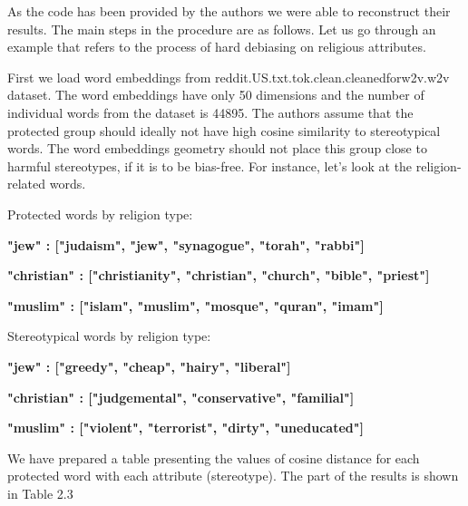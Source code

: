 \documentclass[12pt,]{book}
\begin{document}
As the code has been provided by the authors we were able to reconstruct
their results. The main steps in the procedure are as follows. Let us go
through an example that refers to the process of hard debiasing on
religious attributes.

First we load word embeddings from
reddit.US.txt.tok.clean.cleanedforw2v.w2v dataset. The word embeddings
have only 50 dimensions and the number of individual words from the
dataset is 44895. The authors assume that the protected group should
ideally not have high cosine similarity to stereotypical words. The word
embeddings geometry should not place this group close to harmful
stereotypes, if it is to be bias-free. For instance, let's look at the
religion-related words.

Protected words by religion type:

\textbf{"jew"       : ["judaism", "jew", "synagogue", "torah", "rabbi"]}

\textbf{"christian" : ["christianity", "christian", "church", "bible", "priest"]}

\textbf{"muslim"    : ["islam", "muslim", "mosque", "quran", "imam"]}

Stereotypical words by religion type:

\textbf{"jew"       : ["greedy", "cheap", "hairy", "liberal"]}

\textbf{"christian"       : ["judgemental", "conservative", "familial"]}

\textbf{"muslim"       : ["violent", "terrorist", "dirty", "uneducated"]}

We have prepared a table presenting the values of cosine distance for
each protected word with each attribute (stereotype). The part of the
results is shown in Table 2.3

\footnotesize 
\end{document}
